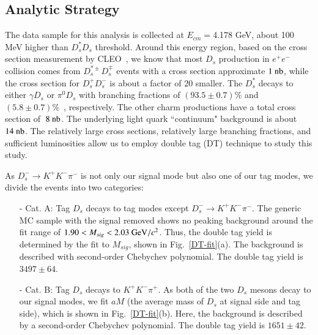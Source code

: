 \par{
    \subsection{Analytic Strategy}
    The data sample for this analysis is collected at $E_{cm}=$4.178 GeV, about 100 MeV higher than $D_{s}^{*}D_{s}$ threshold. Around this energy region, based on the cross section measurement by CLEO~\cite{PRD80-072001}, we know that most $D_{s}$ production in $e^{+}e^{-}$ collision comes from $D_{s}^{*\pm}D_{s}^{\mp}$ events with a cross section approximate $1\ {\rm nb}$, while the cross section for $D_{s}^{+}D_{s}^{-}$ is about a factor of 20 smaller.
    The $D_{s}^{*}$ decays to either $\gamma D_{s}$ or $\pi^{0}D_{s}$ with branching fractions of $(93.5\pm0.7)\%$ and $(5.8\pm0.7)\%$~\cite{PDG2018}, respectively. 
    The other charm productions have a total cross section of $~8\ {\rm nb}$.
    The underlying light quark ``continuum" background is about $14\ {\rm nb}$. 
    The relatively large cross sections, relatively large branching fractions, and sufficient luminosities allow us to employ double tag (DT) technique to study this study.

    As $D_{s}^{-} \rightarrow K^{+}K^{-}\pi^{-}$ is not only our signal mode but also one of our tag modes, we divide the events into two categories:

    \begin{itemize}
        \item[-] Cat. A: Tag $D_{s}$ decays to tag modes except $D_{s}^{-} \rightarrow K^{+}K^{-}\pi^{-}$. The generic MC sample with the signal removed shows no peaking background around the fit range of $1.90 < M_{sig} < 2.03 \ {\rm GeV}/c^{2}$.
            Thus, the double tag yield is determined by the fit to $M_{sig}$, shown in Fig.~\ref{DT-fit}(a). The background is described with second-order Chebychev polynomial. The double tag yield is $3497\pm64$. 
        \item[-] Cat. B: Tag $D_{s}$ decays to $K^{+}K^{-}\pi^{+}$. As both of the two $D_{s}$ mesons decay to our signal modes, we fit $aM$ (the average mass of $D_{s}$ at signal side and tag side), which is shown in Fig.~\ref{DT-fit}(b). 
            Here, the background is described by a second-order Chebychev polynomial. The double tag yield is $1651\pm42$. 
    \end{itemize}

}
